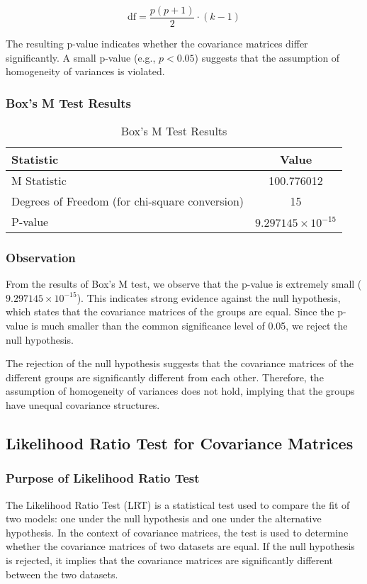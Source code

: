 \documentclass[11pt]{article}
\begin{document}
\[
\text{df} = \frac{p(p + 1)}{2} \cdot (k - 1)
\]

The resulting p-value indicates whether the covariance matrices differ significantly. A small p-value (e.g., \( p < 0.05 \)) suggests that the assumption of homogeneity of variances is violated.
\subsubsection{Box's M Test Results}
\begin{table}[H]
\centering
\begin{tabular}{|l|c|}
    \hline
    \textbf{Statistic} & \textbf{Value} \\
    \hline
    M Statistic & 100.776012 \\
    \hline
    Degrees of Freedom (for chi-square conversion) & 15 \\
    \hline
    P-value & \( 9.297145 \times 10^{-15} \) \\
    \hline
\end{tabular}
\caption{Box's M Test Results}
\end{table}
\subsubsection{Observation}

From the results of Box's M test, we observe that the p-value is extremely small (\(9.297145 \times 10^{-15}\)). This indicates strong evidence against the null hypothesis, which states that the covariance matrices of the groups are equal. Since the p-value is much smaller than the common significance level of 0.05, we reject the null hypothesis. 

The rejection of the null hypothesis suggests that the covariance matrices of the different groups are significantly different from each other. Therefore, the assumption of homogeneity of variances does not hold, implying that the groups have unequal covariance structures.

\subsection{Likelihood Ratio Test for Covariance Matrices}

\subsubsection{Purpose of Likelihood Ratio Test}

The Likelihood Ratio Test (LRT) is a statistical test used to compare the fit of two models: one under the null hypothesis and one under the alternative hypothesis. In the context of covariance matrices, the test is used to determine whether the covariance matrices of two datasets are equal. If the null hypothesis is rejected, it implies that the covariance matrices are significantly different between the two datasets.
\end{document}
